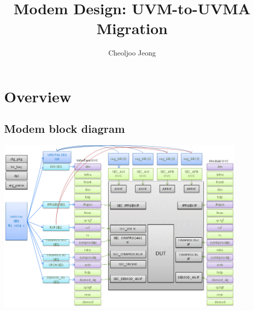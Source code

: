 \documentclass{note}
\begin{document}
\small


\title{\large\bf{}\textcolor{blue2}{Modem Design: UVM-to-UVMA Migration}}
\author{Cheoljoo Jeong}
\date{}
\maketitle

\tableofcontents

\section{Overview}
\subsection{Modem block diagram}
\centerline{\includegraphics[width=12cm]{pics/modem}}
 
\end{document}
